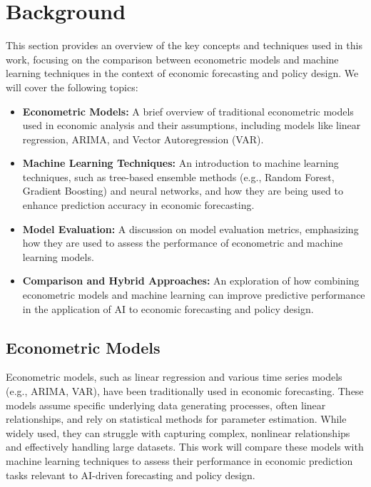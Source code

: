 \chapter{Background}
\label{sec:background}

This section provides an overview of the key concepts and techniques used in this work, focusing on the comparison between econometric models and machine learning techniques in the context of economic forecasting and policy design. We will cover the following topics:

\begin{itemize}
    \item \textbf{Econometric Models:} A brief overview of traditional econometric models used in economic analysis and their assumptions, including models like linear regression, ARIMA, and Vector Autoregression (VAR).
    \item \textbf{Machine Learning Techniques:} An introduction to machine learning techniques, such as tree-based ensemble methods (e.g., Random Forest, Gradient Boosting) and neural networks, and how they are being used to enhance prediction accuracy in economic forecasting.
    \item \textbf{Model Evaluation:} A discussion on model evaluation metrics, emphasizing how they are used to assess the performance of econometric and machine learning models.
    \item \textbf{Comparison and Hybrid Approaches:} An exploration of how combining econometric models and machine learning can improve predictive performance in the application of AI to economic forecasting and policy design.
\end{itemize}

\section{Econometric Models}
\label{subsec:econometric_models}
Econometric models, such as linear regression and various time series models (e.g., ARIMA, VAR), have been traditionally used in economic forecasting. These models assume specific underlying data generating processes, often linear relationships, and rely on statistical methods for parameter estimation. While widely used, they can struggle with capturing complex, nonlinear relationships and effectively handling large datasets. This work will compare these models with machine learning techniques to assess their performance in economic prediction tasks relevant to AI-driven forecasting and policy design.

